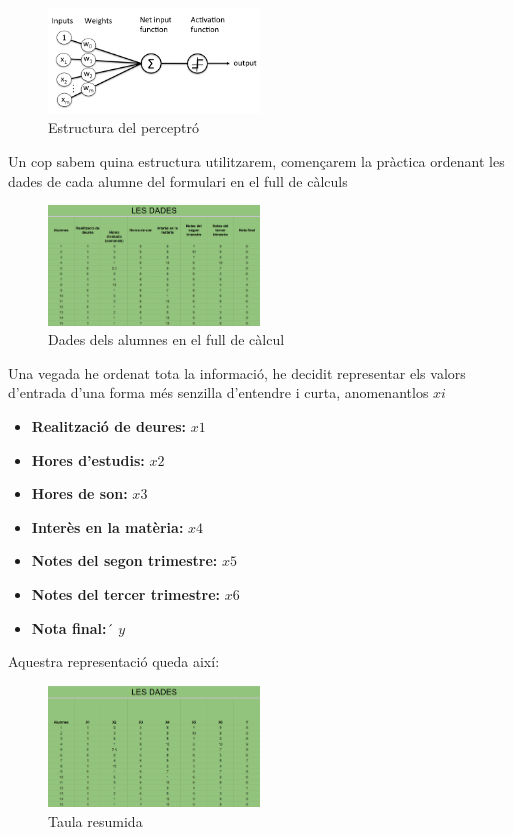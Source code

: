 \begin{figure}[H]
    \centering
    \includegraphics[width=0.5\textwidth]{./figures/perceptro.png}
    \caption{Estructura del perceptró}
\end{figure}

Un cop sabem quina estructura utilitzarem, començarem la pràctica ordenant les dades de cada alumne del formulari en el full de càlculs

\begin{figure}[H]
    \centering
    \includegraphics[width=0.5\textwidth]{./figures/Dades.png}
    \caption{Dades dels alumnes en el full de càlcul}
\end{figure}

Una vegada he ordenat tota la informació, he decidit representar els valors d'entrada d'una forma més senzilla d'entendre i curta, anomenantlos $xi$
\begin{itemize}
 \item \textbf {Realització de deures:} $x1$
 \item \textbf {Hores d'estudis:} $x2$
 \item \textbf {Hores de son:} $x3$
 \item \textbf {Interès en la matèria:} $x4$
 \item \textbf {Notes del segon trimestre:} $x5$
 \item \textbf {Notes del tercer trimestre:} $x6$
 \item \textbf {Nota final:}´ $y$
\end{itemize}

Aquestra representació queda així:

\begin{figure}[H]
    \centering
    \includegraphics[width=0.5\textwidth]{./figures/Dades_resumides.png}
    \caption{Taula resumida}
\end{figure}

